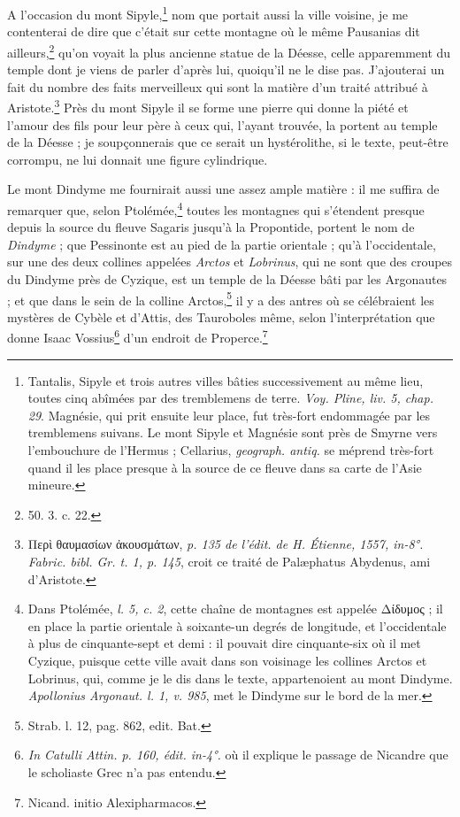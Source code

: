 \documentclass[a4paper, 11pt, oneside, polutonikogreek, french]{article}
\begin{document}
A l'occasion du mont Sipyle,\footnote{Tantalis, Sipyle et trois autres villes bâties successivement au même lieu, toutes cinq abîmées par des tremblemens de terre. \emph{Voy. Pline, liv. 5, chap. 29}. Magnésie, qui prit ensuite leur place, fut très-fort endommagée par les tremblemens suivans. Le mont Sipyle et Magnésie sont près de Smyrne vers l'embouchure de l'Hermus ; Cellarius, \emph{geograph. antiq.} se méprend très-fort quand il les place presque à la source de ce fleuve dans sa carte de l'Asie mineure.} nom que portait aussi la ville voisine, je me contenterai de dire que c'était sur cette montagne où le même Pausanias dit ailleurs,\footnote{50. 3. c. 22.} qu'on voyait la plus ancienne statue de la Déesse, celle apparemment du temple dont je viens de parler d'après lui, quoiqu'il ne le dise pas. J'ajouterai un fait du nombre des faits merveilleux qui sont la matière d'un traité attribué à Aristote.\footnote{Περὶ θαυμασίων ἀκουσμάτων, \emph{p. 135 de l'édit. de H. Étienne, 1557, in-8°. Fabric. bibl. Gr. t. 1, p. 145}, croit ce traité de Palæphatus Abydenus, ami d'Aristote.} Près du mont Sipyle il se forme une pierre qui donne la piété et l'amour des fils pour leur père à ceux qui, l'ayant trouvée, la portent au temple de la Déesse ; je soupçonnerais que ce serait un hystérolithe, si le texte, peut-être corrompu, ne lui donnait une figure cylindrique.

Le mont Dindyme me fournirait aussi une assez ample matière : il me suffira de remarquer que, selon Ptolémée,\footnote{Dans Ptolémée, \emph{l. 5, c. 2}, cette chaîne de montagnes est appelée Δίδυμος ; il en place la partie orientale à soixante-un degrés de longitude, et l'occidentale à plus de cinquante-sept et demi : il pouvait dire cinquante-six où il met Cyzique, puisque cette ville avait dans son voisinage les collines Arctos et Lobrinus, qui, comme je le dis dans le texte, appartenoient au mont Dindyme. \emph{Apollonius Argonaut. l. 1, v. 985}, met le Dindyme sur le bord de la mer.} toutes les montagnes qui s'étendent presque depuis la source du fleuve Sagaris jusqu'à la Propontide, portent le nom de \emph{Dindyme} ; que Pessinonte est au pied de la partie orientale ; qu'à l'occidentale, sur une des deux collines appelées \emph{Arctos} et \emph{Lobrinus}, qui ne sont que des croupes du Dindyme près de Cyzique, est un temple de la Déesse bâti par les Argonautes ; et que dans le sein de la colline Arctos,\footnote{Strab. l. 12, pag. 862, edit. Bat.} il y a des antres où se célébraient les mystères de Cybèle et d'Attis, des Tauroboles même, selon l'interprétation que donne Isaac Vossius\footnote{\emph{In Catulli Attin. p. 160, édit. in-4°.} où il explique le passage de Nicandre que le scholiaste Grec n'a pas entendu.} d'un endroit de Properce.\footnote{Nicand. initio Alexipharmacos.}
\end{document}
